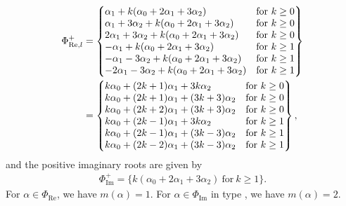 \documentclass[10pt,a4paper]{amsart}
\numberwithin{equation}{section}
\theoremstyle{definition}
\begin{document}
\begin{align*}
\Phi_{\mathrm{Re},l}^{+} &=
\left\{
\begin{array}{@{}ll@{}}
 \alpha_1 + k(\alpha_0 + 2\alpha_1 + 3\alpha_2) & \text{for} \  k \geq 0 \\
 \alpha_1 + 3\alpha_2 + k(\alpha_0 + 2\alpha_1 + 3\alpha_2) & \text{for} \  k \geq 0 \\
 2\alpha_1 + 3\alpha_2 + k(\alpha_0 + 2\alpha_1 + 3\alpha_2) & \text{for} \  k \geq 0 \\
 -\alpha_1 + k(\alpha_0 + 2\alpha_1 + 3\alpha_2) & \text{for} \  k \geq 1 \\
 -\alpha_1 - 3\alpha_2 + k(\alpha_0 + 2\alpha_1 + 3\alpha_2) & \text{for} \  k \geq 1 \\
 -2\alpha_1 - 3\alpha_2 + k(\alpha_0 + 2\alpha_1 + 3\alpha_2) & \text{for} \  k \geq 1
\end{array}
\right\} \\
&=
\left\{
\begin{array}{@{}ll@{}}
 k\alpha_0 + (2k+1)\alpha_1 + 3k\alpha_2 & \text{for} \  k \geq 0 \\
 k\alpha_0 + (2k+1)\alpha_1 + (3k+3)\alpha_2 & \text{for} \  k \geq 0 \\
 k\alpha_0 + (2k+2)\alpha_1 + (3k+3)\alpha_2 & \text{for} \  k \geq 0 \\
 k\alpha_0 + (2k-1)\alpha_1 + 3k\alpha_2 & \text{for} \  k \geq 1 \\
 k\alpha_0 + (2k-1)\alpha_1 + (3k-3)\alpha_2 & \text{for} \  k \geq 1 \\
 k\alpha_0 + (2k-2)\alpha_1 + (3k-3)\alpha_2 & \text{for} \  k \geq 1
\end{array}
\right\},
\end{align*}
and the positive imaginary roots are given by
\begin{align*}\Phi_{\mathrm{Im}}^{+} =
\{
k(\alpha_0 + 2\alpha_1 + 3\alpha_2) \ \text{for} \ k \geq 1
\}.
\end{align*}
For $\alpha\in\Phi_{\mathrm{Re}}$, we have $m(\alpha)=1$. For $\alpha\in\Phi_{\mathrm{Im}}$ in type , we have $m(\alpha)=2$.
\end{document}
